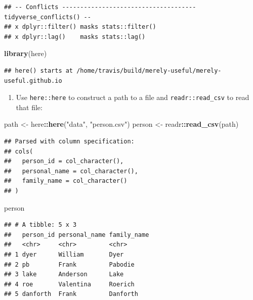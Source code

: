 \documentclass[]{Nemilov}
\newenvironment{Shaded}{\begin{snugshade}}{\end{snugshade}}
\newcommand{\KeywordTok}[1]{\textcolor[rgb]{0.13,0.29,0.53}{\textbf{#1}}}
\newcommand{\NormalTok}[1]{#1}
\newcommand{\OperatorTok}[1]{\textcolor[rgb]{0.81,0.36,0.00}{\textbf{#1}}}
\newcommand{\StringTok}[1]{\textcolor[rgb]{0.31,0.60,0.02}{#1}}
\providecommand{\tightlist}{%
  \setlength{\itemsep}{0pt}\setlength{\parskip}{0pt}}
\begin{document}
\begin{verbatim}
## -- Conflicts ------------------------------------- tidyverse_conflicts() --
## x dplyr::filter() masks stats::filter()
## x dplyr::lag()    masks stats::lag()
\end{verbatim}

\begin{Shaded}
\begin{Highlighting}[]
\KeywordTok{library}\NormalTok{(here)}
\end{Highlighting}
\end{Shaded}

\begin{verbatim}
## here() starts at /home/travis/build/merely-useful/merely-useful.github.io
\end{verbatim}

\begin{enumerate}
\def\labelenumi{\arabic{enumi}.}
\setcounter{enumi}{1}
\tightlist
\item
  Use \texttt{here::here} to construct a path to a file and \texttt{readr::read\_csv} to read that file:
\end{enumerate}

\begin{Shaded}
\begin{Highlighting}[]
\NormalTok{path <-}\StringTok{ }\NormalTok{here}\OperatorTok{::}\KeywordTok{here}\NormalTok{(}\StringTok{"data"}\NormalTok{, }\StringTok{"person.csv"}\NormalTok{)}
\NormalTok{person <-}\StringTok{ }\NormalTok{readr}\OperatorTok{::}\KeywordTok{read_csv}\NormalTok{(path)}
\end{Highlighting}
\end{Shaded}

\begin{verbatim}
## Parsed with column specification:
## cols(
##   person_id = col_character(),
##   personal_name = col_character(),
##   family_name = col_character()
## )
\end{verbatim}

\begin{Shaded}
\begin{Highlighting}[]
\NormalTok{person}
\end{Highlighting}
\end{Shaded}

\begin{verbatim}
## # A tibble: 5 x 3
##   person_id personal_name family_name
##   <chr>     <chr>         <chr>      
## 1 dyer      William       Dyer       
## 2 pb        Frank         Pabodie    
## 3 lake      Anderson      Lake       
## 4 roe       Valentina     Roerich    
## 5 danforth  Frank         Danforth
\end{verbatim}
\end{document}
